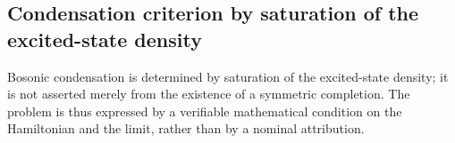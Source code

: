 \subsection{Condensation criterion by saturation of the excited-state density}
\label{v:v:rec:fock_gibbs:section:06}

Bosonic condensation is
determined by saturation of the excited-state density; it is not asserted
merely from the existence of a symmetric completion. The problem
is thus expressed by a verifiable mathematical condition on the
Hamiltonian and the limit, rather than by a nominal attribution.
